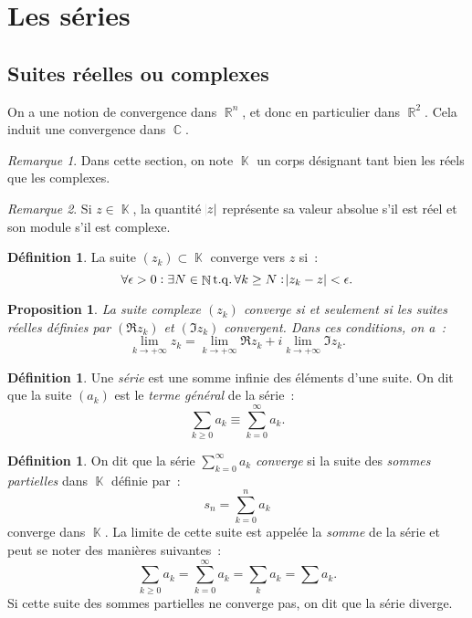 \documentclass{article}
\DeclareMathOperator{\C}{\mathbb C}
\DeclareMathOperator{\K}{\mathbb K}
\DeclareMathOperator{\N}{\mathbb N}
\DeclareMathOperator{\R}{\mathbb R}
\DeclareMathOperator{\tq}{ t.q. }
\newtheorem{prp}[thm]{Proposition}
\theoremstyle{definition}
\newtheorem{déf}[thm]{Définition}
\theoremstyle{remark}
\newtheorem*{rmq}{Remarque}
\begin{document}
\newpage
\section{Les séries}\label{sec:séries}
	\subsection{Suites réelles ou complexes}
		On a une notion de convergence dans $\R^n$, et donc en particulier dans $\R^2$. Cela induit une convergence dans $\C$.

		\begin{rmq} Dans cette section, on note $\K$ un corps désignant tant bien les réels que les complexes. \end{rmq}

		\begin{rmq} Si $z \in \K$, la quantité $\abs z$ représente sa valeur absolue s'il est réel et son module s'il est complexe. \end{rmq}

		\begin{déf} La suite $(z_k) \subset \K$ converge vers $z$ si~:
		\[\forall \epsilon > 0 : \exists N \in \N \tq \forall k \geq N : \abs {z_k-z} < \epsilon.\]
		\end{déf}

		\begin{prp} La suite complexe $(z_k)$ converge si et seulement si les suites réelles définies par $(\Re z_k)$ et $(\Im z_k)$ convergent.
		Dans ces conditions, on a~:
		\[\lim_{k \to +\infty}z_k = \lim_{k \to +\infty}\Re z_k + i\lim_{k \to +\infty}\Im z_k.\]
		\end{prp}

		\begin{déf} Une \emph{série} est une somme infinie des éléments d'une suite. On dit que la suite $(a_k)$ est le \emph{terme général} de la série~:
		\[\sum_{k \geq 0}a_k \equiv \sum_{k=0}^\infty a_k.\]
		\end{déf}

		\begin{déf} On dit que la série $\sum_{k=0}^\infty a_k$ \emph{converge} si la suite des \emph{sommes partielles} dans $\K$ définie par~:
		\[s_n = \sum_{k=0}^n a_k\]
		converge dans $\K$. La limite de cette suite est appelée la \emph{somme} de la série et peut se noter des manières suivantes~:
		\[\sum_{k \geq 0} a_k = \sum_{k=0}^\infty a_k = \sum_k a_k = \sum a_k.\]
		Si cette suite des sommes partielles ne converge pas, on dit que la série diverge.
		\end{déf}
\end{document}
